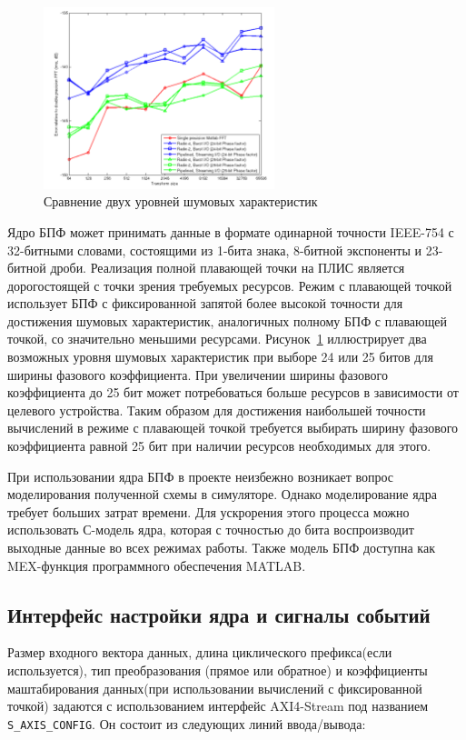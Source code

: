\begin{figure}[h]
	\centering
	\includegraphics[width=0.6\textwidth]{image/fft_xilinx_fp.png}
	\caption{Сравнение двух уровней шумовых характеристик}
	\label{fft_xilinx_fp}
\end{figure}

Ядро БПФ может принимать данные в формате одинарной точности IEEE-754 с 32-битными словами, состоящими из 1-бита знака, 8-битной экспоненты и 23-битной дроби. Реализация полной плавающей точки на ПЛИС является дорогостоящей с точки зрения требуемых ресурсов. Режим с плавающей точкой использует БПФ с фиксированной запятой более высокой точности для достижения шумовых характеристик, аналогичных полному БПФ с плавающей точкой, со значительно меньшими ресурсами. Рисунок~\ref{fft_xilinx_fp} иллюстрирует два возможных уровня шумовых характеристик при выборе 24 или 25 битов для ширины фазового коэффициента. При увеличении ширины фазового коэффициента до 25 бит может потребоваться больше ресурсов в зависимости от целевого устройства. Таким образом для достижения наибольшей точности вычислений в режиме с плавающей точкой требуется выбирать ширину фазового коэффициента равной 25 бит при наличии ресурсов необходимых для этого.

При использовании ядра БПФ в проекте неизбежно возникает вопрос моделирования полученной схемы в симуляторе. Однако моделирование ядра требует больших затрат времени. Для ускрорения этого процесса можно использовать С-модель ядра, которая с точностью до бита воспроизводит выходные данные во всех режимах работы. Также модель БПФ доступна как MEX-функция программного обеспечения MATLAB.

\subsection{Интерфейс настройки ядра и сигналы событий}

Размер входного вектора данных, длина циклического префикса(если используется), тип преобразования (прямое или обратное) и коэффициенты маштабирования данных(при использовании вычислений с фиксированной точкой) задаются с использованием интерфейс AXI4-Stream под названием \verb|S_AXIS_CONFIG|. 
Он состоит из следующих линий ввода/вывода: 

